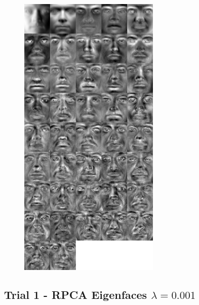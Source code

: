 \documentclass[11pt]{scrartcl} %
\theoremstyle{plain}
\begin{document}
\begin{figure}[H]
\centering
\includegraphics[width=0.6\textwidth]{figures/trial2rpca0dot005eigenfaces.jpg}
\end{figure}

\subsection{Trial 1 - RPCA Eigenfaces $\lambda = 0.001$}
\end{document}
